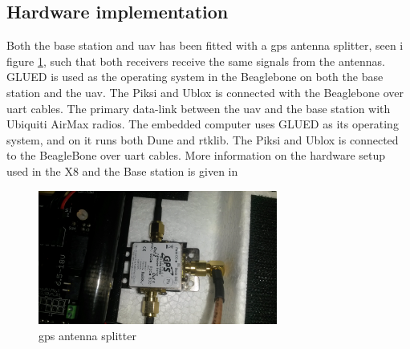 \subsection{Hardware implementation}
Both the base station and \gls{uav} has been fitted with a \gls{gps} antenna splitter, seen i figure \ref{figure:AntennaSplitter}, such that both receivers receive the same signals from the antennas. GLUED is used as the operating system in the Beaglebone on both the base station and the \gls{uav}. The Piksi and Ublox is connected with the Beaglebone over uart cables. The primary data-link between the \gls{uav} and the base station with Ubiquiti AirMax radios.
The embedded computer uses GLUED as its operating system, and on it runs both Dune and \gls{rtklib}. The Piksi and Ublox is connected to the BeagleBone over uart cables.
More information on the hardware setup used in the X8 and the Base station is given in \citep{KlausenX8}
\begin{figure}[H]
	\centering
		\includegraphics[width=0.7\textwidth]{figs/066.jpg}
		\caption{\gls{gps} antenna splitter}
		\label{figure:AntennaSplitter}
\end{figure}
\cleardoublepage